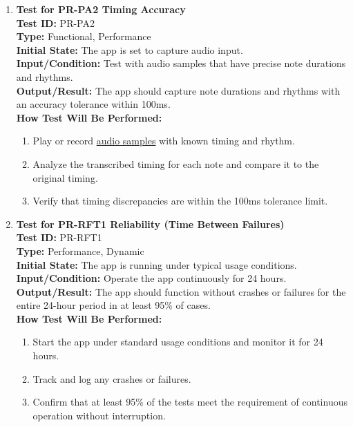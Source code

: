 \documentclass[12pt, titlepage]{article}
\begin{document}
\begin{enumerate}
    \item \textbf{Test for PR-PA2 Timing Accuracy} \\
      \newline
      \textbf{Test ID:} PR-PA2 \\
      \textbf{Type:} Functional, Performance \\
      \textbf{Initial State:} The app is set to capture audio input. \\
      \textbf{Input/Condition:} Test with audio samples that have precise note durations and rhythms. \\
      \textbf{Output/Result:} The app should capture note durations and rhythms with an accuracy tolerance within 100ms. \\
      \textbf{How Test Will Be Performed:}
      \begin{enumerate}
          \item Play or record 
          \href{https://github.com/emilyperica/ScoreGen/tree/main/test/TestingDatasets/piano-samples/sample-songs}{audio samples} 
          with known timing and rhythm.
          \item Analyze the transcribed timing for each note and compare it to the original timing.
          \item Verify that timing discrepancies are within the 100ms tolerance limit.
      \end{enumerate}

    \item \textbf{Test for PR-RFT1 Reliability (Time Between Failures)} \\
      \newline
      \textbf{Test ID:} PR-RFT1 \\
      \textbf{Type:} Performance, Dynamic \\
      \textbf{Initial State:} The app is running under typical usage conditions. \\
      \textbf{Input/Condition:} Operate the app continuously for 24 hours. \\
      \textbf{Output/Result:} The app should function without crashes or failures for the entire 24-hour period in at least 
      95\% of cases. \\
      \textbf{How Test Will Be Performed:}
      \begin{enumerate}
          \item Start the app under standard usage conditions and monitor it for 24 hours.
          \item Track and log any crashes or failures.
          \item Confirm that at least 95\% of the tests meet the requirement of continuous operation without interruption.
      \end{enumerate}


\end{enumerate}
\end{document}
